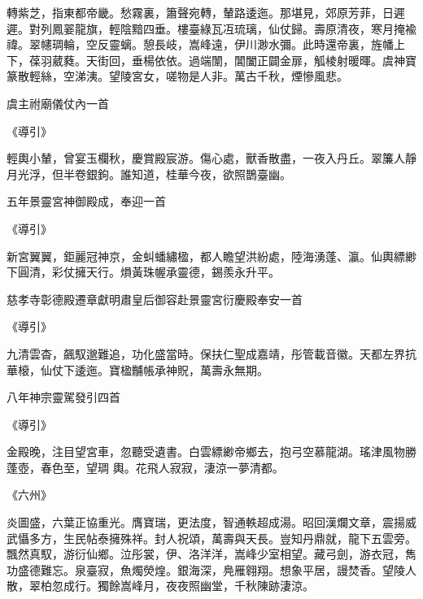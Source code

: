 \begin{pinyinscope}
 轉紫芝，指東都帝畿。愁霧裏，簫聲宛轉，輦路逶迤。那堪見，郊原芳菲，日遲遲。對列鳳翣龍旗，輕陰黯四垂。樓臺綠瓦冱琉璃，仙仗歸。壽原清夜，寒月掩褕禕。翠幰琱輪，空反靈螭。憩長岐，嵩峰遠，伊川渺水彌。此時還帝裏，旌幡上下，葆羽葳蕤。天街回，垂楊依依。過端闈，閶闔正闢金扉，觚棱射暖暉。虞神寶篆散輕絲，空涕洟。望陵宮女，嗟物是人非。萬古千秋，煙慘風悲。



 虞主祔廟儀仗內一首



 《導引》



 輕輿小輦，曾宴玉欄秋，慶賞殿宸游。傷心處，獸香散盡，一夜入丹丘。翠簾人靜月光浮，但半卷銀鉤。誰知道，桂華今夜，欲照鵲臺幽。



 五年景靈宮神御殿成，奉迎一首



 《導引》



 新宮翼翼，鉅麗冠神京，金虯蟠繡楹，都人瞻望洪紛處，陸海湧蓬、瀛。仙輿縹緲下圓清，彩仗擁天行。熉黃珠幄承靈德，錫羨永升平。



 慈孝寺彰德殿遷章獻明肅皇后御容赴景靈宮衍慶殿奉安一首



 《導引》



 九清雲杳，飆馭邈難追，功化盛當時。保扶仁聖成嘉靖，彤管載音徽。天都左界抗華榱，仙仗下逶迤。寶楹黼帳承神貺，萬壽永無期。



 八年神宗靈駕發引四首



 《導引》



 金殿晚，注目望宮車，忽聽受遺書。白雲縹緲帝鄉去，抱弓空慕龍湖。瑤津風物勝蓬壺，春色至，望琱
 輿。花飛人寂寂，淒涼一夢清都。



 《六州》



 炎圖盛，六葉正協重光。膺寶瑞，更法度，智通軼超成湯。昭回漢爛文章，震揚威武懾多方，生民帖泰擁殊祥。封人祝頌，萬壽與天長。豈知丹鼎就，龍下五雲旁。飄然真馭，游衍仙鄉。泣彤裳，伊、洛洋洋，嵩峰少室相望。藏弓劍，游衣冠，雋功盛德難忘。泉臺寂，魚燭熒煌。銀海深，鳧雁翱翔。想象平居，謾焚香。望陵人散，翠柏忽成行。獨餘嵩峰月，夜夜照幽堂，千秋陳跡淒涼。




\end{pinyinscope}
